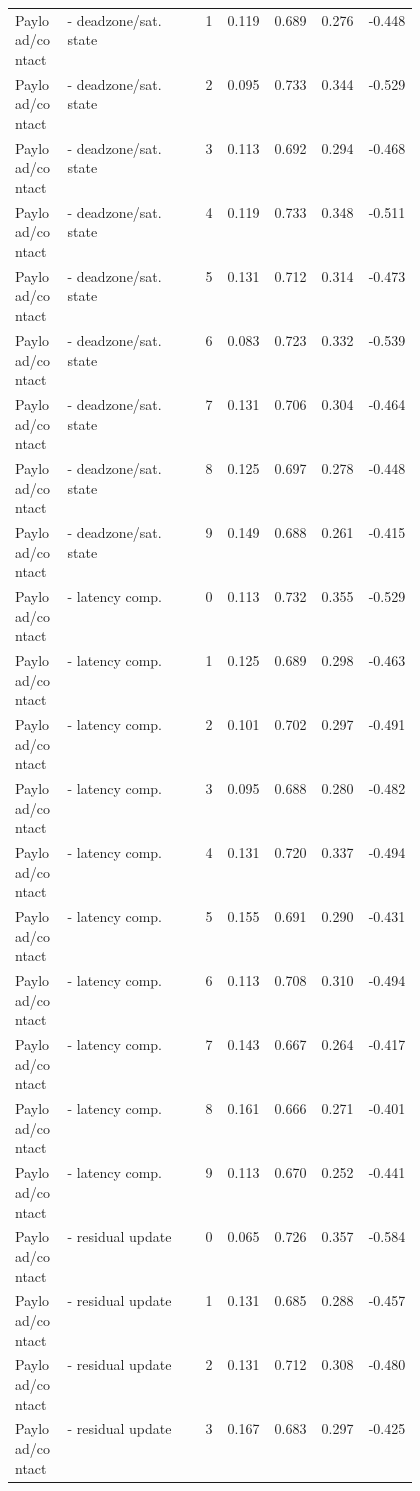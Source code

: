 \documentclass{article}
\begin{document}
\begin{center}
\begin{longtable}{p{0.13\linewidth}p{0.34\linewidth}rrrrr}
Payload/contact & - deadzone/sat. state & 1 & 0.119 & 0.689 & 0.276 & -0.448\\
Payload/contact & - deadzone/sat. state & 2 & 0.095 & 0.733 & 0.344 & -0.529\\
Payload/contact & - deadzone/sat. state & 3 & 0.113 & 0.692 & 0.294 & -0.468\\
Payload/contact & - deadzone/sat. state & 4 & 0.119 & 0.733 & 0.348 & -0.511\\
Payload/contact & - deadzone/sat. state & 5 & 0.131 & 0.712 & 0.314 & -0.473\\
Payload/contact & - deadzone/sat. state & 6 & 0.083 & 0.723 & 0.332 & -0.539\\
Payload/contact & - deadzone/sat. state & 7 & 0.131 & 0.706 & 0.304 & -0.464\\
Payload/contact & - deadzone/sat. state & 8 & 0.125 & 0.697 & 0.278 & -0.448\\
Payload/contact & - deadzone/sat. state & 9 & 0.149 & 0.688 & 0.261 & -0.415\\
Payload/contact & - latency comp. & 0 & 0.113 & 0.732 & 0.355 & -0.529\\
Payload/contact & - latency comp. & 1 & 0.125 & 0.689 & 0.298 & -0.463\\
Payload/contact & - latency comp. & 2 & 0.101 & 0.702 & 0.297 & -0.491\\
Payload/contact & - latency comp. & 3 & 0.095 & 0.688 & 0.280 & -0.482\\
Payload/contact & - latency comp. & 4 & 0.131 & 0.720 & 0.337 & -0.494\\
Payload/contact & - latency comp. & 5 & 0.155 & 0.691 & 0.290 & -0.431\\
Payload/contact & - latency comp. & 6 & 0.113 & 0.708 & 0.310 & -0.494\\
Payload/contact & - latency comp. & 7 & 0.143 & 0.667 & 0.264 & -0.417\\
Payload/contact & - latency comp. & 8 & 0.161 & 0.666 & 0.271 & -0.401\\
Payload/contact & - latency comp. & 9 & 0.113 & 0.670 & 0.252 & -0.441\\
Payload/contact & - residual update & 0 & 0.065 & 0.726 & 0.357 & -0.584\\
Payload/contact & - residual update & 1 & 0.131 & 0.685 & 0.288 & -0.457\\
Payload/contact & - residual update & 2 & 0.131 & 0.712 & 0.308 & -0.480\\
Payload/contact & - residual update & 3 & 0.167 & 0.683 & 0.297 & -0.425\\

\end{longtable}
\end{center}
\end{document}
